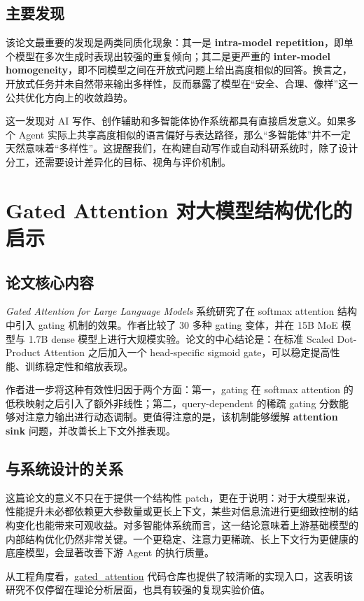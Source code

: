\documentclass[UTF8,11pt]{ctexart}
\begin{document}
\subsection{主要发现}
该论文最重要的发现是两类同质化现象：其一是 \textbf{intra-model repetition}，即单个模型在多次生成时表现出较强的重复倾向；其二是更严重的 \textbf{inter-model homogeneity}，即不同模型之间在开放式问题上给出高度相似的回答。换言之，开放式任务并未自然带来输出多样性，反而暴露了模型在“安全、合理、像样”这一公共优化方向上的收敛趋势。

这一发现对 AI 写作、创作辅助和多智能体协作系统都具有直接启发意义。如果多个 Agent 实际上共享高度相似的语言偏好与表达路径，那么“多智能体”并不一定天然意味着“多样性”。这提醒我们，在构建自动写作或自动科研系统时，除了设计分工，还需要设计差异化的目标、视角与评价机制。

\section{Gated Attention 对大模型结构优化的启示}
\subsection{论文核心内容}
\emph{Gated Attention for Large Language Models} 系统研究了在 softmax attention 结构中引入 gating 机制的效果。作者比较了 30 多种 gating 变体，并在 15B MoE 模型与 1.7B dense 模型上进行大规模实验。论文的中心结论是：在标准 Scaled Dot-Product Attention 之后加入一个 head-specific sigmoid gate，可以稳定提高性能、训练稳定性和缩放表现。

作者进一步将这种有效性归因于两个方面：第一，gating 在 softmax attention 的低秩映射之后引入了额外非线性；第二，query-dependent 的稀疏 gating 分数能够对注意力输出进行动态调制。更值得注意的是，该机制能够缓解 \textbf{attention sink} 问题，并改善长上下文外推表现。

\subsection{与系统设计的关系}
这篇论文的意义不只在于提供一个结构性 patch，更在于说明：对于大模型来说，性能提升未必都依赖更大参数量或更长上下文，某些对信息流进行更细致控制的结构变化也能带来可观收益。对多智能体系统而言，这一结论意味着上游基础模型的内部结构优化仍然非常关键。一个更稳定、注意力更稀疏、长上下文行为更健康的底座模型，会显著改善下游 Agent 的执行质量。

从工程角度看，\href{https://github.com/qiuzh20/gated_attention}{gated\_attention} 代码仓库也提供了较清晰的实现入口，这表明该研究不仅停留在理论分析层面，也具有较强的复现实验价值。
\end{document}
